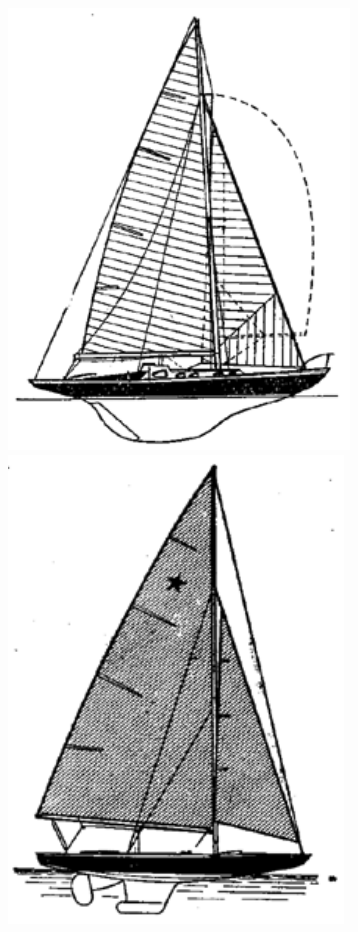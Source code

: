 \documentclass[a4paper, 12pt, twoside, final]{scrbook}
\begin{document}
\begin{figure}[htbp]
	\hfill{}\includegraphics[scale=0.7]{L6}%
	\hfill{}\includegraphics[scale=0.7]{Star_class}%

\end{figure}
\end{document}
